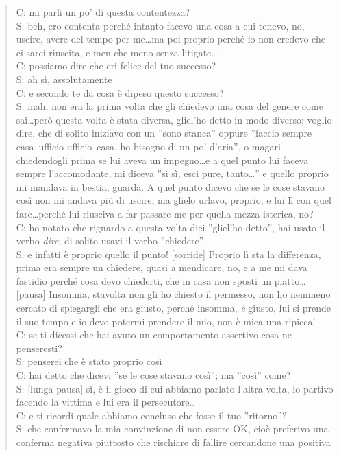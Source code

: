 \begin{verse}
C: mi parli un po' di questa contentezza?\\
S: beh, ero contenta perché intanto facevo una cosa a cui tenevo, no, uscire, avere del tempo per me\ldots{}ma poi proprio perché io non credevo che ci sarei riuscita, e men che meno senza litigate\ldots\\
C: possiamo dire che eri felice del tuo successo?\\
S: ah sì, assolutamente\\
C: e secondo te da cosa è dipeso questo successo?\\
S: mah, non era la prima volta che gli chiedevo una cosa del genere come sai\ldots{}però questa volta è stata diversa, gliel'ho detto
in modo diverso; voglio dire, che di solito iniziavo con un ''sono stanca'' oppure ''faccio sempre casa--ufficio ufficio--casa, ho bisogno di un po' d'aria'', o magari chiedendogli prima se lui aveva un impegno\ldots{}e a quel punto lui faceva sempre l'accomodante, mi diceva ''sì sì, esci pure, tanto\ldots'' e quello proprio mi mandava in bestia, guarda. A quel punto dicevo che se le cose stavano così non mi andava più di uscire, ma glielo urlavo, proprio, e lui lì con quel fare\ldots{}perché lui riusciva a far passare me per quella mezza isterica, no?\\
C: ho notato che riguardo a questa volta dici ''gliel'ho detto'', hai usato il verbo \emph{dire}; di solito usavi il verbo ''chiedere''\\
S: e infatti è proprio quello il punto! [sorride] Proprio lì sta la differenza, prima era sempre un chiedere, quasi a mendicare, no, e a me mi dava fastidio perché cosa devo chiederti, che in casa non sposti un piatto\ldots{}[pausa] Insomma, stavolta non gli ho chiesto il permesso, non ho nemmeno cercato di spiegargli che era giusto, perché insomma, \emph{è} giusto, lui si prende il suo tempo e io devo potermi prendere il mio, non è mica una ripicca!\\
C: se ti dicessi che hai avuto un comportamento assertivo cosa ne penseresti?\\
S: penserei che è stato proprio così\\
C: hai detto che dicevi ''se le cose stavano così''; ma ''così'' come?\\
S: [lunga pausa] sì, è il gioco di cui abbiamo parlato l'altra volta, io partivo facendo la vittima e lui era il persecutore\ldots\\
C: e ti ricordi quale abbiamo concluso che fosse il tuo ''ritorno''?\\
S: che confermavo la mia convinzione di non essere OK, cioè preferivo una conferma negativa piuttosto che rischiare di fallire cercandone una positiva\\
\end{verse}

